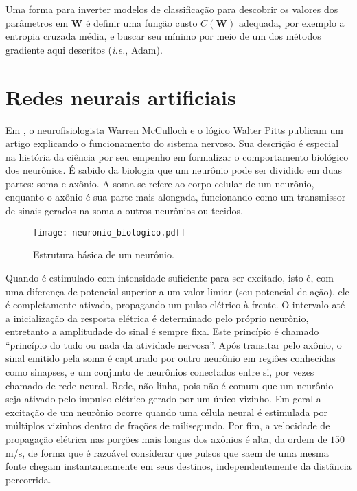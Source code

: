     Uma forma para inverter modelos de classificação para descobrir os valores dos parâmetros em $\boldsymbol{W}$ é definir uma função custo $C(\boldsymbol{W})$ adequada, por exemplo a entropia cruzada média, e buscar seu mínimo por meio de um dos métodos gradiente aqui descritos (\textit{i.e.}, Adam).

  \section{Redes neurais artificiais}

    Em , o neurofisiologista Warren McCulloch e o lógico Walter Pitts publicam um artigo explicando o funcionamento do sistema nervoso. Sua descrição é especial na história da ciência por seu empenho em formalizar o comportamento biológico dos neurônios. É sabido da biologia que um neurônio pode ser dividido em duas partes: soma e axônio. A soma se refere ao corpo celular de um neurônio, enquanto o axônio é sua parte mais alongada, funcionando como um transmissor de sinais gerados na soma a outros neurônios ou tecidos.

    \begin{figure}
      \begin{center}
        \texttt{[image: neuronio\_biologico.pdf]}
      \end{center}
      \caption{Estrutura básica de um neurônio.}
      \label{f:neuronio_biologico}
    \end{figure}

    Quando é estimulado com intensidade suficiente para ser excitado, isto é, com uma diferença de potencial superior a um valor limiar (seu potencial de ação), ele é completamente ativado, propagando um pulso elétrico à frente. O intervalo até a inicialização da resposta elétrica é determinado pelo próprio neurônio, entretanto a amplitudade do sinal é sempre fixa. Este princípio é chamado ``princípio do tudo ou nada da atividade nervosa''. Após transitar pelo axônio, o sinal emitido pela soma é capturado por outro neurônio em regiôes conhecidas como sinapses, e um conjunto de neurônios conectados entre si, por vezes chamado de rede neural. Rede, não linha, pois não é comum que um neurônio seja ativado pelo impulso elétrico gerado por um único vizinho. Em geral a excitação de um neurônio ocorre quando uma célula neural é estimulada por múltiplos vizinhos dentro de frações de milisegundo. Por fim, a velocidade de propagação elétrica nas porções mais longas dos axônios é alta, da ordem de $150$ m/s, de forma que é razoável considerar que pulsos que saem de uma mesma fonte chegam instantaneamente em seus destinos, independentemente da distância percorrida.

